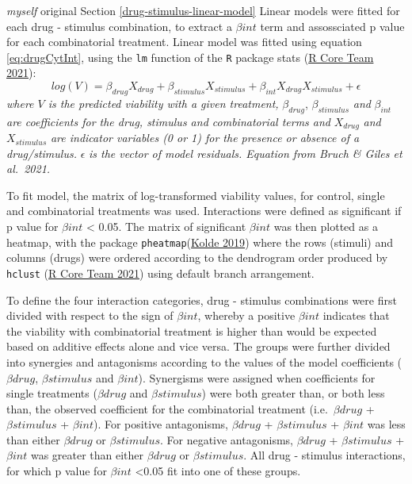 \documentclass[11pt, a4paper, twosided]{book}
\begin{document}
\emph{myself} original
Section \ref{drug-stimulus-linear-model} Linear models were fitted for each drug - stimulus combination, to extract a \(\beta{int}\) term and assossciated p value for each combinatorial treatment. Linear model was fitted using equation \eqref{eq:drugCytInt}, using the \texttt{lm} function of the \texttt{R} package stats (\protect\hyperlink{ref-R-base}{R Core Team 2021}):
\begin{equation}
            log(V) = \beta_{drug}X_{drug} + \beta_{stimulus}X_{stimulus} + \beta_{int}X_{drug}X_{stimulus} + \epsilon
                                       \label{eq:drugCytInt}
    \end{equation}
\emph{where \(V\) is the predicted viability with a given treatment,} \(\beta_{drug}\), \(\beta_{stimulus}\) \emph{and} \(\beta_{int}\) \emph{are coefficients for the drug, stimulus and combinatorial terms and} \(X_{drug}\) \emph{and} \(X_{stimulus}\) \emph{are indicator variables (0 or 1) for the presence or absence of a drug/stimulus.} \(\epsilon\) \emph{is the vector of model residuals. Equation from Bruch \& Giles et al.~2021.}

To fit model, the matrix of log-transformed viability values, for control, single and combinatorial treatments was used. Interactions were defined as significant if p value for \(\beta{int}\) \textless{} 0.05. The matrix of significant \(\beta{int}\) was then plotted as a heatmap, with the package \texttt{pheatmap}(\protect\hyperlink{ref-R-pheatmap}{Kolde 2019}) where the rows (stimuli) and columns (drugs) were ordered according to the dendrogram order produced by \texttt{hclust} (\protect\hyperlink{ref-R-base}{R Core Team 2021}) using default branch arrangement.

To define the four interaction categories, drug - stimulus combinations were first divided with respect to the sign of \(\beta{int}\), whereby a positive \(\beta{int}\) indicates that the viability with combinatorial treatment is higher than would be expected based on additive effects alone and vice versa. The groups were further divided into synergies and antagonisms according to the values of the model coefficients (\(\beta{drug}\), \(\beta{stimulus}\) and \(\beta{int}\)). Synergisms were assigned when coefficients for single treatments (\(\beta{drug}\) and \(\beta{stimulus}\)) were both greater than, or both less than, the observed coefficient for the combinatorial treatment (i.e.~\(\beta{drug}\) + \(\beta{stimulus}\) + \(\beta{int}\)). For positive antagonisms, \(\beta{drug}\) + \(\beta{stimulus}\) + \(\beta{int}\) was less than either \(\beta{drug}\) or \(\beta{stimulus}\). For negative antagonisms, \(\beta{drug}\) + \(\beta{stimulus}\) + \(\beta{int}\) was greater than either \(\beta{drug}\) or \(\beta{stimulus}\). All drug - stimulus interactions, for which p value for \(\beta{int}\) \textless0.05 fit into one of these groups.
\end{document}
